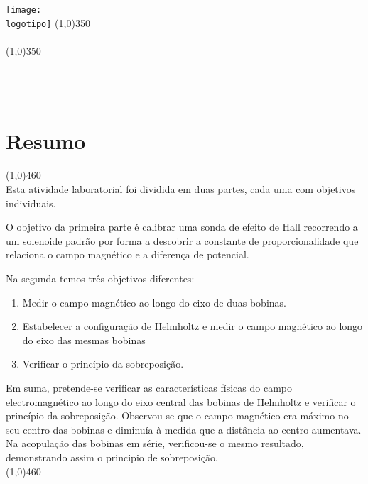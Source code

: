  
	
	
		
\pagestyle{fancy}
\fancyhf{}
\rhead{\uc}
\lhead{\titulo}
\cfoot{\thepage}

 \begin{titlepage} 
	\begin{center}
	\texttt{[image: \\logotipo]}
	\line(1,0){350} \\ 
		\vspace*{2mm}
	{\Huge \titulo} \\
		\vspace*{1mm}
	\line(1,0){350} \\ 
		\vspace*{2mm}
	{\Large \uc \data \\ \Large \vspace{2mm} \tipo \grupo} \\
		\vspace*{20mm}
	{\large \autores} \\ 
	\end{center}

\section*{Resumo}
\line(1,0){460} \\
Esta atividade laboratorial foi dividida em duas partes, cada uma com objetivos individuais.
\par O objetivo da primeira parte é calibrar uma sonda de efeito de Hall recorrendo a um solenoide padrão por forma a descobrir a constante de proporcionalidade que relaciona o campo magnético e a diferença de potencial. 
\par Na segunda temos três objetivos diferentes: 
	\begin{enumerate}
\item Medir o campo magnético ao longo do eixo de duas bobinas. 
\item Estabelecer a configuração de Helmholtz e medir o campo magnético ao longo do eixo das mesmas bobinas 
\item Verificar o princípio da sobreposição.
	\end{enumerate}
	Em suma, pretende-se verificar as características físicas do campo electromagnético ao longo do eixo central das bobinas de Helmholtz e verificar o princípio da sobreposição. Observou-se que o campo magnético era máximo no seu centro das bobinas e diminuía à medida que a distância ao centro aumentava. \\ 
	Na acopulação das bobinas em série, verificou-se o mesmo resultado, demonstrando assim o principio de sobreposição. \\
\line(1,0){460} \\

\end{titlepage}

